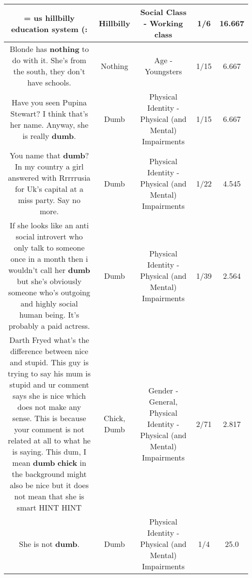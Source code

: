 \documentclass[11pt]{article}
\newlength\mylength
\begin{document}
\begin{center}
\begin{longtable}{|C{.65\mylength}|C{.30\mylength}|C{.12\mylength}|C{.12\mylength}|C{.12\mylength}|}
  \small = us \textbf{hillbilly} education system (:\normalsize   & Hillbilly & Social Class - Working class & 1/6 & 16.667 \\  \hline
  \small Blonde has \textbf{nothing} to do with it. She's from the south, they don't have schools.\normalsize   & Nothing & Age - Youngsters & 1/15 & 6.667 \\  \hline
  \small Have you seen Pupina Stewart? I think that's her name. Anyway, she is really \textbf{dumb}.\normalsize   & Dumb & Physical Identity - Physical (and Mental) Impairments & 1/15 & 6.667 \\  \hline
  \small You name that \textbf{dumb}? In my country a girl answered with Rrrrrusia for Uk's capital at a miss party. Say no more.\normalsize   & Dumb & Physical Identity - Physical (and Mental) Impairments & 1/22 & 4.545 \\  \hline
  \small If she looks like an anti social introvert who only talk to someone once in a month then i wouldn't call her \textbf{dumb} but she's obviously someone who's outgoing and highly social human being. It's probably a paid actress.\normalsize   & Dumb & Physical Identity - Physical (and Mental) Impairments & 1/39 & 2.564 \\  \hline
  \small Darth Fryed what's the difference between nice and stupid. This guy is trying to say his mum is stupid and ur comment says she is nice which does not make any sense. This is because your comment is not related at all to what he is saying. This dum, I mean \textbf{dumb} \textbf{chick} in the background might also be nice but it does not mean that she is smart HINT HINT\normalsize   & Chick, Dumb & Gender - General, Physical Identity - Physical (and Mental) Impairments & 2/71 & 2.817 \\  \hline
  \small She is not \textbf{dumb}.\normalsize   & Dumb & Physical Identity - Physical (and Mental) Impairments & 1/4 & 25.0 \\  \hline

\end{longtable}
\end{center}
\end{document}
